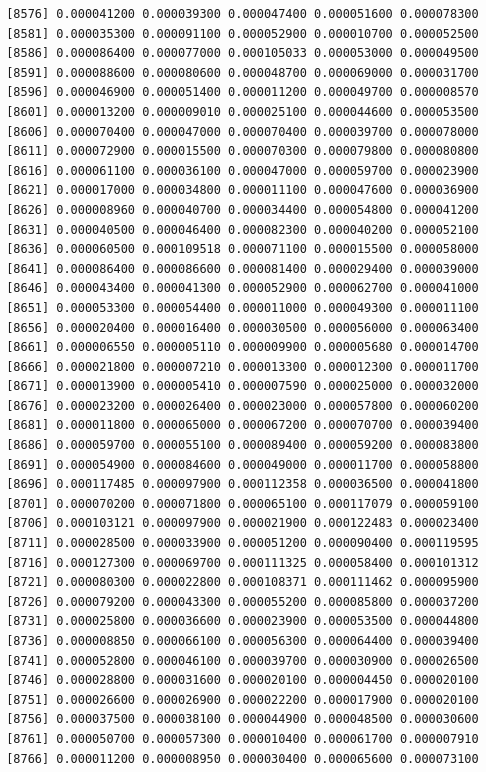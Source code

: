 \documentclass[]{article}
\begin{document}
\begin{verbatim}
 [8576] 0.000041200 0.000039300 0.000047400 0.000051600 0.000078300
 [8581] 0.000035300 0.000091100 0.000052900 0.000010700 0.000052500
 [8586] 0.000086400 0.000077000 0.000105033 0.000053000 0.000049500
 [8591] 0.000088600 0.000080600 0.000048700 0.000069000 0.000031700
 [8596] 0.000046900 0.000051400 0.000011200 0.000049700 0.000008570
 [8601] 0.000013200 0.000009010 0.000025100 0.000044600 0.000053500
 [8606] 0.000070400 0.000047000 0.000070400 0.000039700 0.000078000
 [8611] 0.000072900 0.000015500 0.000070300 0.000079800 0.000080800
 [8616] 0.000061100 0.000036100 0.000047000 0.000059700 0.000023900
 [8621] 0.000017000 0.000034800 0.000011100 0.000047600 0.000036900
 [8626] 0.000008960 0.000040700 0.000034400 0.000054800 0.000041200
 [8631] 0.000040500 0.000046400 0.000082300 0.000040200 0.000052100
 [8636] 0.000060500 0.000109518 0.000071100 0.000015500 0.000058000
 [8641] 0.000086400 0.000086600 0.000081400 0.000029400 0.000039000
 [8646] 0.000043400 0.000041300 0.000052900 0.000062700 0.000041000
 [8651] 0.000053300 0.000054400 0.000011000 0.000049300 0.000011100
 [8656] 0.000020400 0.000016400 0.000030500 0.000056000 0.000063400
 [8661] 0.000006550 0.000005110 0.000009900 0.000005680 0.000014700
 [8666] 0.000021800 0.000007210 0.000013300 0.000012300 0.000011700
 [8671] 0.000013900 0.000005410 0.000007590 0.000025000 0.000032000
 [8676] 0.000023200 0.000026400 0.000023000 0.000057800 0.000060200
 [8681] 0.000011800 0.000065000 0.000067200 0.000070700 0.000039400
 [8686] 0.000059700 0.000055100 0.000089400 0.000059200 0.000083800
 [8691] 0.000054900 0.000084600 0.000049000 0.000011700 0.000058800
 [8696] 0.000117485 0.000097900 0.000112358 0.000036500 0.000041800
 [8701] 0.000070200 0.000071800 0.000065100 0.000117079 0.000059100
 [8706] 0.000103121 0.000097900 0.000021900 0.000122483 0.000023400
 [8711] 0.000028500 0.000033900 0.000051200 0.000090400 0.000119595
 [8716] 0.000127300 0.000069700 0.000111325 0.000058400 0.000101312
 [8721] 0.000080300 0.000022800 0.000108371 0.000111462 0.000095900
 [8726] 0.000079200 0.000043300 0.000055200 0.000085800 0.000037200
 [8731] 0.000025800 0.000036600 0.000023900 0.000053500 0.000044800
 [8736] 0.000008850 0.000066100 0.000056300 0.000064400 0.000039400
 [8741] 0.000052800 0.000046100 0.000039700 0.000030900 0.000026500
 [8746] 0.000028800 0.000031600 0.000020100 0.000004450 0.000020100
 [8751] 0.000026600 0.000026900 0.000022200 0.000017900 0.000020100
 [8756] 0.000037500 0.000038100 0.000044900 0.000048500 0.000030600
 [8761] 0.000050700 0.000057300 0.000010400 0.000061700 0.000007910
 [8766] 0.000011200 0.000008950 0.000030400 0.000065600 0.000073100

\end{verbatim}
\end{document}
